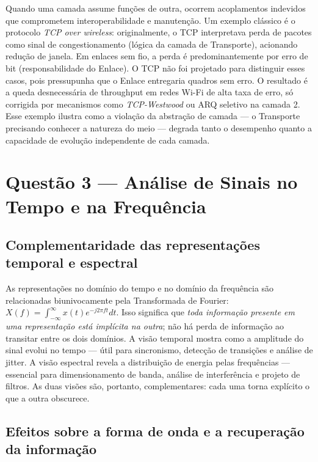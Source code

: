 \documentclass[conference]{IEEEtran}
\begin{document}
Quando uma camada assume funções de outra, ocorrem acoplamentos indevidos que comprometem
interoperabilidade e manutenção. Um exemplo clássico é o protocolo
\textit{TCP over wireless}: originalmente, o TCP interpretava perda de pacotes como sinal
de congestionamento (lógica da camada de Transporte), acionando redução de janela. Em enlaces
sem fio, a perda é predominantemente por erro de bit (responsabilidade do Enlace). O TCP não
foi projetado para distinguir esses casos, pois pressupunha que o Enlace entregaria quadros
sem erro. O resultado é a queda desnecessária de throughput em redes Wi-Fi de alta taxa de
erro, só corrigida por mecanismos como \textit{TCP-Westwood} ou ARQ seletivo na camada 2.
Esse exemplo ilustra como a violação da abstração de camada --- o Transporte precisando
conhecer a natureza do meio --- degrada tanto o desempenho quanto a capacidade de evolução
independente de cada camada.

\section*{Questão 3 — Análise de Sinais no Tempo e na Frequência}

\subsection*{Complementaridade das representações temporal e espectral}

As representações no domínio do tempo e no domínio da frequência são relacionadas biunivocamente
pela Transformada de Fourier: $X(f) = \int_{-\infty}^{\infty} x(t)e^{-j2\pi ft}dt$. Isso
significa que \textit{toda informação presente em uma representação está implícita na outra};
não há perda de informação ao transitar entre os dois domínios. A visão temporal mostra como
a amplitude do sinal evolui no tempo --- útil para sincronismo, detecção de transições e
análise de jitter. A visão espectral revela a distribuição de energia pelas frequências ---
essencial para dimensionamento de banda, análise de interferência e projeto de filtros.
As duas visões são, portanto, complementares: cada uma torna explícito o que a outra obscurece.

\subsection*{Efeitos sobre a forma de onda e a recuperação da informação}
\end{document}
